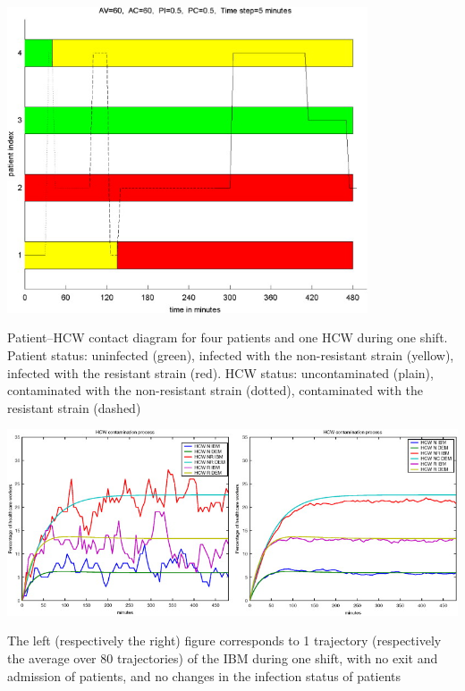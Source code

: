 \documentclass[aspectratio=43]{beamer}
\begin{document}
\begin{frame}

\begin{center}
\includegraphics[width=0.8\textwidth]{FIGS/Dagata_etal_patients_profiles.jpg}
\end{center}
\vfill
\tiny Patient–HCW contact diagram for four patients and one HCW during one shift. Patient status: uninfected (green), infected with the non-resistant strain (yellow), infected with the resistant strain (red). HCW status: uncontaminated (plain), contaminated with the non-resistant strain (dotted), contaminated with the resistant strain (dashed)
\end{frame}


\begin{frame}
\begin{center}
\includegraphics[width=\textwidth]{FIGS/Dagata_etal_comparisons.jpg}
\end{center}
\vfill
\tiny 
The left (respectively the right) figure corresponds to 1 trajectory (respectively the average over 80 trajectories) of the IBM during one shift, with no exit and admission of patients, and no changes in the infection status of patients
\end{frame}
\end{document}
